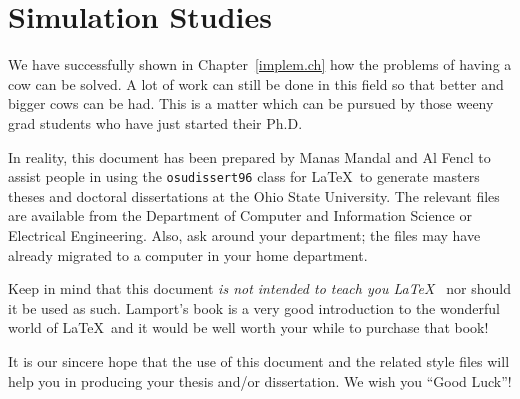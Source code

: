 \chapter{Simulation Studies}
\label{ch4.numericalAnalysis}

We have successfully shown in Chapter~\ref{implem.ch} how the problems
of having a cow can be solved. A lot of work can still be done in this
field so that better and bigger cows can be had. This is a matter
which can be pursued by those weeny grad students who have just
started their Ph.D. 

In reality, this document has been prepared by Manas Mandal and Al
Fencl to assist people in using the {\tt osudissert96} class for
\LaTeX\ to generate masters theses and doctoral dissertations at the Ohio
State University. The relevant files are available from the Department
of Computer and Information Science or Electrical Engineering.  Also, ask
around your department; the files may have already migrated to a computer
in your home department.

Keep in mind that this document {\em is not intended to teach you
\LaTeX\ } nor should it be used as such.  Lamport's book
\cite{lamport:latex} is a very good introduction to the wonderful
world of \LaTeX\ and it would be well worth your while to purchase
that book!

It is our sincere hope that the use of this document and the related
style files will help you in producing your thesis and/or
dissertation. We wish you ``Good Luck''!
